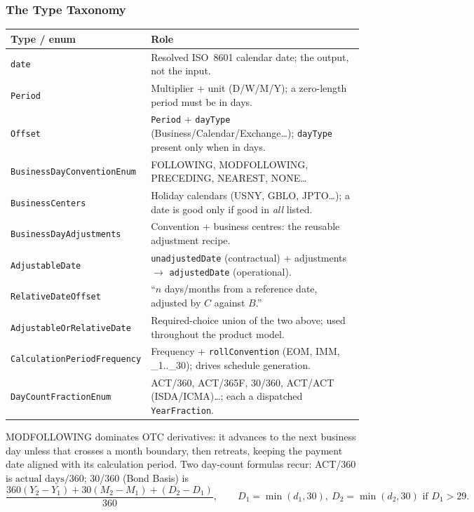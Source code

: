 \documentclass[11pt,a4paper]{article}
\begin{document}
\subsubsection{The Type Taxonomy}
\label{sec:cdm-date-types}

\begin{center}\small
\begin{tabular}{@{}l >{\raggedright\arraybackslash}p{}@{}}
\toprule
\textbf{Type / enum} & \textbf{Role} \\
\midrule
\texttt{date} & Resolved ISO~8601 calendar date; the output, not the input. \\
\texttt{Period} & Multiplier + unit (D/W/M/Y); a zero-length period must be in days. \\
\texttt{Offset} & \texttt{Period} + \texttt{dayType} (Business/Calendar/Exchange\ldots); \texttt{dayType} present only when in days. \\
\texttt{BusinessDayConventionEnum} & FOLLOWING, MODFOLLOWING, PRECEDING, NEAREST, NONE\ldots \\
\texttt{BusinessCenters} & Holiday calendars (USNY, GBLO, JPTO\ldots); a date is good only if good in \emph{all} listed. \\
\texttt{BusinessDayAdjustments} & Convention + business centres: the reusable adjustment recipe. \\
\texttt{AdjustableDate} & \texttt{unadjustedDate} (contractual) + adjustments $\to$ \texttt{adjustedDate} (operational). \\
\texttt{RelativeDateOffset} & ``$n$ days/months from a reference date, adjusted by $C$ against $B$.'' \\
\texttt{AdjustableOrRelativeDate} & Required-choice union of the two above; used throughout the product model. \\
\texttt{CalculationPeriodFrequency} & Frequency + \texttt{rollConvention} (EOM, IMM, \_1..\_30); drives schedule generation. \\
\texttt{DayCountFractionEnum} & ACT/360, ACT/365F, 30/360, ACT/ACT (ISDA/ICMA)\ldots; each a dispatched \texttt{YearFraction}. \\
\bottomrule
\end{tabular}
\end{center}

\noindent MODFOLLOWING dominates OTC derivatives: it advances to the next business day unless that crosses a month boundary, then retreats, keeping the payment date aligned with its calculation period. Two day-count formulas recur: ACT/360 is $\text{actual days}/360$; 30/360 (Bond Basis) is
\[
\frac{360(Y_2-Y_1)+30(M_2-M_1)+(D_2-D_1)}{360},\qquad D_1=\min(d_1,30),\ D_2=\min(d_2,30)\text{ if }D_1>29.
\]
\end{document}
